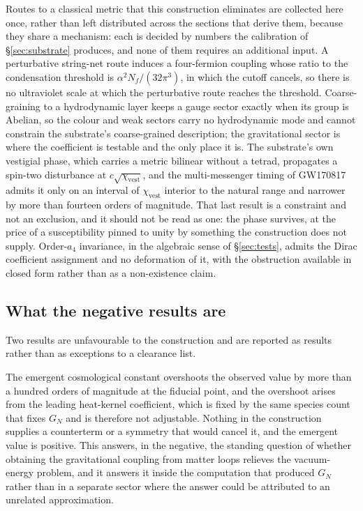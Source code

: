 \documentclass[aps,prd,nofootinbib,superscriptaddress,12pt]{revtex4-2}
\begin{document}
Routes to a classical metric that this construction eliminates are collected
here once, rather than left distributed across the sections that derive them,
because they share a mechanism: each is decided by numbers the calibration of
\S\ref{sec:substrate} produces, and none of them requires an additional input.
A perturbative string-net route induces a four-fermion coupling whose ratio to
the condensation threshold is $\alpha^2 N_f/(32\pi^3)$, in which the cutoff
cancels, so there is no ultraviolet scale at which the perturbative route
reaches the threshold. Coarse-graining to a hydrodynamic layer keeps a gauge
sector exactly when its group is Abelian, so the colour and weak sectors carry
no hydrodynamic mode and cannot constrain the substrate's coarse-grained
description; the gravitational sector is where the coefficient is testable and
the only place it is. The substrate's own vestigial phase, which carries a
metric bilinear without a tetrad, propagates a spin-two disturbance at
$c\sqrt{\chi_{\mathrm{vest}}}$, and the multi-messenger timing of GW170817
admits it only on an interval of $\chi_{\mathrm{vest}}$ interior to the natural
range and narrower by more than fourteen orders of magnitude. That last result
is a constraint and not an exclusion, and it should not be read as one: the
phase survives, at the price of a susceptibility pinned to unity by something
the construction does not supply. Order-$a_4$ invariance, in the algebraic sense
of \S\ref{sec:tests}, admits the Dirac coefficient assignment and no deformation
of it, with the obstruction available in closed form rather than as a
non-existence claim.

\subsection{What the negative results are}
\label{sec:scope-negatives}

Two results are unfavourable to the construction and are reported as results
rather than as exceptions to a clearance list.

The emergent cosmological constant overshoots the observed value by more than a
hundred orders of magnitude at the fiducial point, and the overshoot arises from
the leading heat-kernel coefficient, which is fixed by the same species count
that fixes $G_N$ and is therefore not adjustable. Nothing in the construction
supplies a counterterm or a symmetry that would cancel it, and the emergent
value is positive. This answers, in the negative, the standing question of
whether obtaining the gravitational coupling from matter loops relieves the
vacuum-energy problem, and it answers it inside the computation that produced
$G_N$ rather than in a separate sector where the answer could be attributed to
an unrelated approximation.
\end{document}
